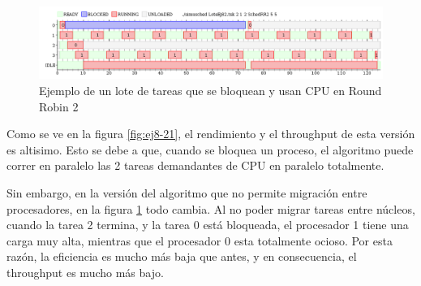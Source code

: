 \begin{figure}[H]
\caption{Ejemplo de un lote de tareas que se bloquean y usan CPU en Round Robin 2}
\label{fig:ej8-22}
\includegraphics[width=0.9\columnwidth]{imgs/ej8-2rr2.png}
\end{figure}


Como se ve en la figura \ref{fig:ej8-21}, el rendimiento y el throughput de esta versión es altisimo. Esto se debe a que, cuando se bloquea un proceso, el algoritmo puede correr en paralelo las 2 tareas demandantes de CPU en paralelo totalmente.

Sin embargo, en la versión del algoritmo que no permite migración entre procesadores, en la figura \ref{fig:ej8-22} todo cambia. Al no poder migrar tareas entre núcleos, cuando la tarea 2 termina, y la tarea 0 está bloqueada, el procesador 1 tiene una carga muy alta, mientras que el procesador 0 esta totalmente ocioso. Por esta razón, la eficiencia es mucho más baja que antes, y en consecuencia, el throughput es mucho más bajo.



